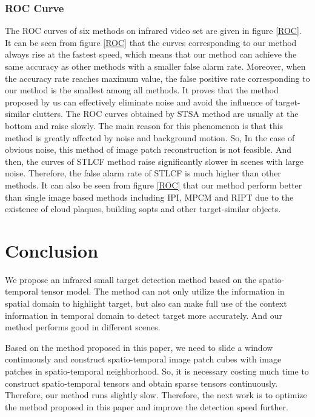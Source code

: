 \documentclass[journal]{IEEEtran}
\begin{document}
\subsubsection{ROC Curve}
The ROC curves of six methods on infrared video set are given in figure \ref{ROC}. It can be seen from figure \ref{ROC} that the curves corresponding to our method always rise at the fastest speed, which means that our method can achieve the same accuracy as other methods with a smaller false alarm rate. Moreover, when the accuracy rate reaches maximum value, the false positive rate corresponding to our method is the smallest among all methods. It proves that the method proposed by us can effectively eliminate noise and avoid the influence of target-similar clutters. The ROC curves obtained by STSA method are usually at the bottom and raise slowly. The main reason for this phenomenon is that this method is greatly affected by noise and background motion. So, In the case of obvious noise, this method of image patch reconstruction is not feasible. And then, the curves of STLCF method raise significantly slower in scenes with large noise. Therefore, the false alarm rate of STLCF is much higher than other methods. It can also be seen from figure \ref{ROC} that our method perform better than single image based methods including IPI, MPCM and RIPT due to the existence of cloud plaques, building sopts and other target-similar objects.


\section{Conclusion}
We propose an infrared small target detection method based on the spatio-temporal tensor model. The method can not only utilize the information in spatial domain to highlight target, but also can make full use of the context information in temporal domain to detect target more accurately. And our method performs good in different scenes.

Based on the method proposed in this paper, we need to slide a window continuously and construct spatio-temporal image patch cubes with image patches in spatio-temporal neighborhood. So, it is necessary costing much time to construct spatio-temporal tensors and obtain sparse tensors continuously. Therefore, our method runs slightly slow. Therefore, the next work is to optimize the method proposed in this paper and improve the detection speed further.
\end{document}
